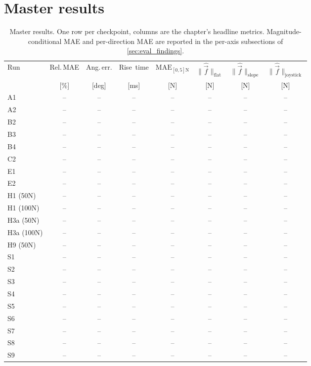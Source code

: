 \section{Master results}
\label{sec:eval_master}

\begin{table}[h]
\centering
\caption{Master results. One row per checkpoint, columns are the
chapter's headline metrics. Magnitude-conditional MAE and per-direction
MAE are reported in the per-axis subsections of \cref{sec:eval_findings}.}
\label{tab:eval_master}
\small
\begin{tabular}{l|cccc|cc|c}
\hline
Run & Rel.\,MAE & Ang.\,err. & Rise~time & $\text{MAE}_{[0,5]\text{N}}$ & $\|\hat{\vec{f}}\|_{\text{flat}}$ & $\|\hat{\vec{f}}\|_{\text{slope}}$ & $\|\hat{\vec{f}}\|_{\text{joystick}}$ \\
 & [\%] & [deg] & [ms] & [N] & [N] & [N] & [N] \\
\hline \hline
A1  & -- & -- & -- & -- & -- & -- & -- \\
A2  & -- & -- & -- & -- & -- & -- & -- \\
B2  & -- & -- & -- & -- & -- & -- & -- \\
B3  & -- & -- & -- & -- & -- & -- & -- \\
B4  & -- & -- & -- & -- & -- & -- & -- \\
C2  & -- & -- & -- & -- & -- & -- & -- \\
E1  & -- & -- & -- & -- & -- & -- & -- \\
E2  & -- & -- & -- & -- & -- & -- & -- \\
\hline
H1 (50N)  & -- & -- & -- & -- & -- & -- & -- \\
H1 (100N) & -- & -- & -- & -- & -- & -- & -- \\
H3a (50N) & -- & -- & -- & -- & -- & -- & -- \\
H3a (100N)& -- & -- & -- & -- & -- & -- & -- \\
H9 (50N)  & -- & -- & -- & -- & -- & -- & -- \\
\hline
S1 & -- & -- & -- & -- & -- & -- & -- \\
S2 & -- & -- & -- & -- & -- & -- & -- \\
S3 & -- & -- & -- & -- & -- & -- & -- \\
S4 & -- & -- & -- & -- & -- & -- & -- \\
S5 & -- & -- & -- & -- & -- & -- & -- \\
S6 & -- & -- & -- & -- & -- & -- & -- \\
S7 & -- & -- & -- & -- & -- & -- & -- \\
S8 & -- & -- & -- & -- & -- & -- & -- \\
S9 & -- & -- & -- & -- & -- & -- & -- \\
\hline
\end{tabular}
\end{table}


